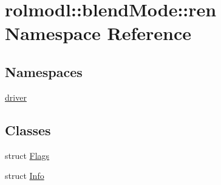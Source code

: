 \hypertarget{namespacerolmodl_1_1blend_mode_1_1ren}{}\section{rolmodl\+::blend\+Mode\+::ren Namespace Reference}
\label{namespacerolmodl_1_1blend_mode_1_1ren}
\subsection*{Namespaces}
\begin{DoxyCompactItemize}
\item 
 \mbox{\hyperlink{namespacerolmodl_1_1blend_mode_1_1ren_1_1driver}{driver}}
\end{DoxyCompactItemize}
\subsection*{Classes}
\begin{DoxyCompactItemize}
\item 
struct \mbox{\hyperlink{structrolmodl_1_1blend_mode_1_1ren_1_1_flags}{Flags}}
\item 
struct \mbox{\hyperlink{structrolmodl_1_1blend_mode_1_1ren_1_1_info}{Info}}
\end{DoxyCompactItemize}
